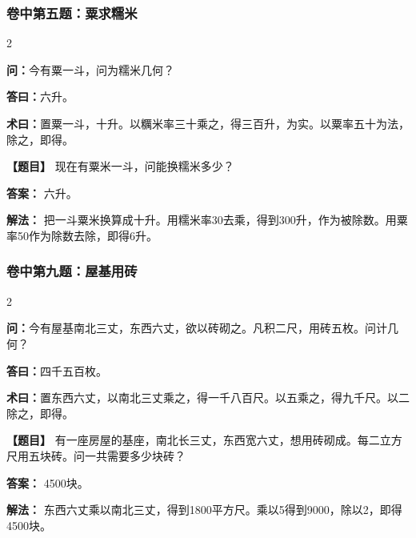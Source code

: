 \documentclass[11pt,a4paper]{article}
\begin{document}
\subsubsection*{卷中第五题：粟求糯米}
\begin{paracol}{2}
\begin{problemclassical}
\textbf{问：}今有粟一斗，问为糯米几何？

\textbf{答曰：}六升。

\textbf{术曰：}置粟一斗，十升。以糲米率三十乘之，得三百升，为实。以粟率五十为法，除之，即得。
\end{problemclassical}
\switchcolumn
\begin{problemmodern}
\textbf{【题目】} 现在有粟米一斗，问能换糯米多少？

\textbf{答案：} 六升。

\textbf{解法：} 把一斗粟米换算成十升。用糯米率30去乘，得到300升，作为被除数。用粟率50作为除数去除，即得6升。
\end{problemmodern}
\end{paracol}

\vspace{0.3cm}

\subsubsection*{卷中第九题：屋基用砖}
\begin{paracol}{2}
\begin{problemclassical}
\textbf{问：}今有屋基南北三丈，东西六丈，欲以砖砌之。凡积二尺，用砖五枚。问计几何？

\textbf{答曰：}四千五百枚。

\textbf{术曰：}置东西六丈，以南北三丈乘之，得一千八百尺。以五乘之，得九千尺。以二除之，即得。
\end{problemclassical}
\switchcolumn
\begin{problemmodern}
\textbf{【题目】} 有一座房屋的基座，南北长三丈，东西宽六丈，想用砖砌成。每二立方尺用五块砖。问一共需要多少块砖？

\textbf{答案：} 4500块。

\textbf{解法：} 东西六丈乘以南北三丈，得到1800平方尺。乘以5得到9000，除以2，即得4500块。
\end{problemmodern}
\end{paracol}

\newpage
\end{document}
